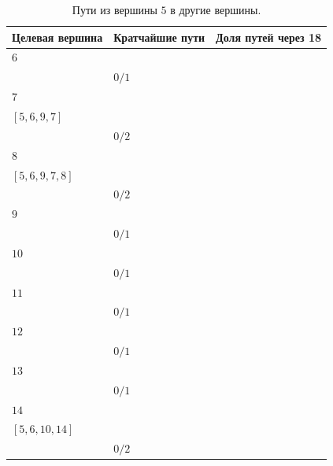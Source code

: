 \documentclass[12pt, a4paper]{extarticle}
\begin{document}
\begin{table}[h!]
    \caption{Пути из вершины $5$ в другие вершины.}
    \label{tbl:10-5}
    \begin{tabularx}{\textwidth}{|X|X|X|}
        \hline 
        Целевая вершина & Кратчайшие пути & Доля путей через 18 \\
        \hline 
        $6$ & \begin{tabular}{@{}l@{}} $[5, 6]$ \\ \end{tabular} & $0/1$ \\
        \hline
        $7$ & \begin{tabular}{@{}l@{}} $[5, 6, 3, 7]$ \\  $[5, 6, 9, 7]$ \\ \end{tabular} & $0/2$ \\
        \hline
        $8$ & \begin{tabular}{@{}l@{}} $[5, 6, 3, 7, 8]$ \\  $[5, 6, 9, 7, 8]$ \\ \end{tabular} & $0/2$ \\
        \hline
        $9$ & \begin{tabular}{@{}l@{}} $[5, 6, 9]$ \\ \end{tabular} & $0/1$ \\
        \hline
        $10$ & \begin{tabular}{@{}l@{}} $[5, 6, 10]$ \\ \end{tabular} & $0/1$ \\
        \hline
        $11$ & \begin{tabular}{@{}l@{}} $[5, 6, 10, 11]$ \\ \end{tabular} & $0/1$ \\
        \hline
        $12$ & \begin{tabular}{@{}l@{}} $[5, 6, 9, 13, 12]$ \\ \end{tabular} & $0/1$ \\
        \hline
        $13$ & \begin{tabular}{@{}l@{}} $[5, 6, 9, 13]$ \\ \end{tabular} & $0/1$ \\
        \hline
        $14$ & \begin{tabular}{@{}l@{}} $[5, 6, 9, 14]$ \\  $[5, 6, 10, 14]$ \\ \end{tabular} & $0/2$ \\

\end{tabularx}
\end{table}
\end{document}
